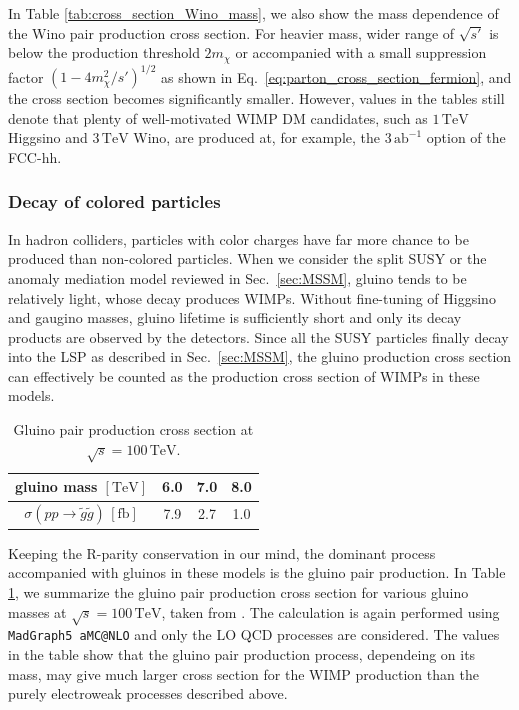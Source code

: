 \documentclass[12pt,twoside,book]{article}
\begin{document}
In Table \ref{tab:cross_section_Wino_mass}, we also show the mass dependence of the Wino pair production cross section.
For heavier mass, wider range of $\sqrt{s'}$ is below the production threshold $2 m_{\chi}$ or accompanied with a small suppression factor $(1-4 m_\chi^2 / s')^{1/2}$ as shown in Eq.~\eqref{eq:parton_cross_section_fermion}, and the cross section becomes significantly smaller.
However, values in the tables still denote that plenty of well-motivated WIMP DM candidates, such as $1\,\mathrm{TeV}$ Higgsino and $3\,\mathrm{TeV}$ Wino, are produced at, for example, the $3\,\mathrm{ab}^{-1}$ option of the FCC-hh.





\subsubsection*{Decay of colored particles}

In hadron colliders, particles with color charges have far more chance to be produced than non-colored particles.
When we consider the split SUSY or the anomaly mediation model reviewed in Sec.~\ref{sec:MSSM}, gluino tends to be relatively light, whose decay produces WIMPs.
Without fine-tuning of Higgsino and gaugino masses, gluino lifetime is sufficiently short and only its decay products are observed by the detectors.
Since all the SUSY particles finally decay into the LSP as described in Sec.~\ref{sec:MSSM}, the gluino production cross section can effectively be counted as the production cross section of WIMPs in these models.

\begin{table}[t]
  \centering
  \begin{tabular}{c|ccc}
    gluino mass $\mathrm{[TeV]}$ & 6.0 & 7.0 & 8.0 \\ \hline
    $\sigma(p p \to \tilde{g} \tilde{g})\, \mathrm{[fb]}$ & 7.9 & 2.7 & 1.0
  \end{tabular}
  \caption{Gluino pair production cross section at $\sqrt{s} = 100\,\mathrm{TeV}$.}
  \label{tab:gluino_pair}
\end{table}

Keeping the R-parity conservation in our mind, the dominant process accompanied with gluinos in these models is the gluino pair production.
In Table \ref{tab:gluino_pair}, we summarize the gluino pair production cross section for various gluino masses at $\sqrt{s} = 100\,\mathrm{TeV}$, taken from \cite{Asai:2019wst}.
The calculation is again performed using \texttt{MadGraph5 aMC@NLO} and only the LO QCD processes are considered.
The values in the table show that the gluino pair production process, dependeing on its mass, may give much larger cross section for the WIMP production than the purely electroweak processes described above.
\end{document}
